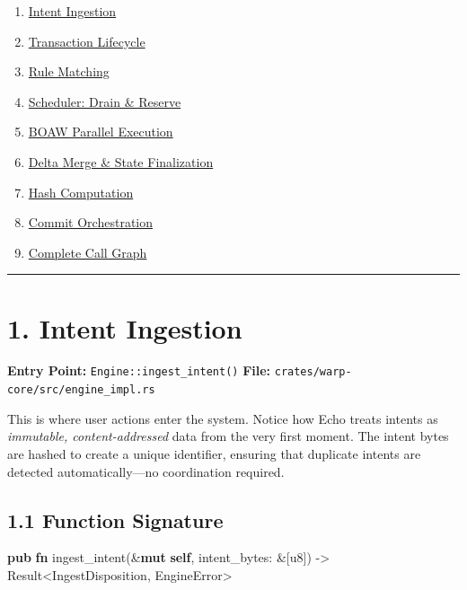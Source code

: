 \documentclass[11pt]{book}
\newenvironment{Shaded}{}{}
\newcommand{\DataTypeTok}[1]{\textcolor[rgb]{0.56,0.13,0.00}{#1}}
\newcommand{\KeywordTok}[1]{\textcolor[rgb]{0.00,0.44,0.13}{\textbf{#1}}}
\newcommand{\NormalTok}[1]{#1}
\newcommand{\OperatorTok}[1]{\textcolor[rgb]{0.40,0.40,0.40}{#1}}
\providecommand{\tightlist}{%
  \setlength{\itemsep}{0pt}\setlength{\parskip}{0pt}}
\begin{document}
\begin{enumerate}
\def\labelenumi{\arabic{enumi}.}
\tightlist
\item
  \hyperref[intent-ingestion]{Intent Ingestion}
\item
  \hyperref[transaction-lifecycle]{Transaction Lifecycle}
\item
  \hyperref[rule-matching]{Rule Matching}
\item
  \hyperref[scheduler-drain-reserve]{Scheduler: Drain \& Reserve}
\item
  \hyperref[boaw-parallel-execution]{BOAW Parallel Execution}
\item
  \hyperref[delta-merge-state-finalization]{Delta Merge \& State
  Finalization}
\item
  \hyperref[hash-computation]{Hash Computation}
\item
  \hyperref[commit-orchestration]{Commit Orchestration}
\item
  \hyperref[complete-call-graph]{Complete Call Graph}
\end{enumerate}

\begin{center}\rule{0.5\linewidth}{0.5pt}\end{center}

\section{1. Intent Ingestion}\label{intent-ingestion}

\textbf{Entry Point:} \texttt{Engine::ingest\_intent()} \textbf{File:}
\texttt{crates/warp-core/src/engine\_impl.rs}

\begin{tourguide}
This is where user actions enter the system. Notice how Echo treats intents as \emph{immutable, content-addressed} data from the very first moment. The intent bytes are hashed to create a unique identifier, ensuring that duplicate intents are detected automatically---no coordination required.
\end{tourguide}

\subsection{1.1 Function Signature}\label{function-signature}

\begin{Shaded}
\begin{Highlighting}[]
\KeywordTok{pub} \KeywordTok{fn}\NormalTok{ ingest\_intent(}\OperatorTok{\&}\KeywordTok{mut} \KeywordTok{self}\OperatorTok{,}\NormalTok{ intent\_bytes}\OperatorTok{:} \OperatorTok{\&}\NormalTok{[}\DataTypeTok{u8}\NormalTok{]) }\OperatorTok{{-}\textgreater{}} \DataTypeTok{Result}\OperatorTok{\textless{}}\NormalTok{IngestDisposition}\OperatorTok{,}\NormalTok{ EngineError}\OperatorTok{\textgreater{}}
\end{Highlighting}
\end{Shaded}
\end{document}
